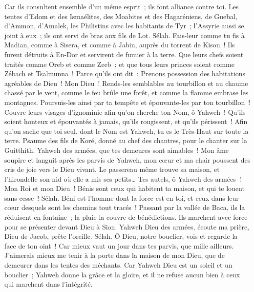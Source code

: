 \begin{multicols}{2}
Car ils consultent ensemble d'un même esprit~; ils font alliance contre toi.
Les tentes d'Edom et des Ismaélites, des Moabites et des Hagaréniens,
de Guebal, d'Ammon, d'Amalek, les Philistins avec les habitants de Tyr~;
l'Assyrie aussi se joint à eux~; ils ont servi de bras aux fils de Lot. Sélah.
Fais-leur comme tu fis à Madian, comme à Sisera, et comme à Jabin, auprès du torrent de Kison~!
Ils furent détruits à En-Dor et servirent de fumier à la terre.
Que leurs chefs soient traités comme Oreb et comme Zeeb~; et que tous leurs princes soient comme Zébach et Tsalmunna~!
Parce qu'ils ont dit~: Prenons possession des habitations agréables de Dieu~!
Mon Dieu~! Rends-les semblables au tourbillon et au chaume chassé par le vent,
comme le feu brûle une forêt, et comme la flamme embrase les montagnes.
Poursuis-les ainsi par ta tempête et épouvante-les par ton tourbillon~!
Couvre leurs visages d'ignominie afin qu'on cherche ton Nom, ô Yahweh~!
Qu'ils soient honteux et épouvantés à jamais, qu'ils rougissent, et qu'ils périssent~!
Afin qu'on sache que toi seul, dont le Nom est Yahweh, tu es le Très-Haut sur toute la terre.
\VerseOne{}Psaume des fils de Koré, donné au chef des chantres, pour le chanter sur la Guitthith.
Yahweh des armées, que tes demeures sont aimables~!
Mon âme soupire et languit après les parvis de Yahweh, mon cœur et ma chair poussent des cris de joie vers le Dieu vivant.
Le passereau même trouve sa maison, et l'hirondelle son nid où elle a mis ses petits… Tes autels, ô Yahweh des armées~! Mon Roi et mon Dieu~!
Bénis sont ceux qui habitent ta maison, et qui te louent sans cesse~! Sélah.
Béni est l'homme dont la force est en toi, et ceux dans leur cœur desquels sont les chemins tout tracés~!
Passant par la vallée de Baca, ils la réduisent en fontaine~; la pluie la couvre de bénédictions.
Ils marchent avec force pour se présenter devant Dieu à Sion.
Yahweh Dieu des armées, écoute ma prière, Dieu de Jacob, prête l'oreille. Sélah.
Ô Dieu, notre bouclier, vois et regarde la face de ton oint~!
Car mieux vaut un jour dans tes parvis, que mille ailleurs. J'aimerais mieux me tenir à la porte dans la maison de mon Dieu, que de demeurer dans les tentes des méchants.
Car Yahweh Dieu est un soleil et un bouclier~; Yahweh donne la grâce et la gloire, et il ne refuse aucun bien à ceux qui marchent dans l'intégrité.

\end{multicols}
